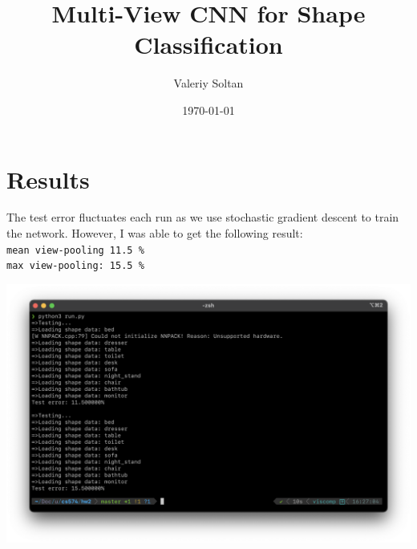 \documentclass{article}
\title{Multi-View CNN for Shape Classification}
\author{Valeriy Soltan}
\date{\today}
\begin{document}
\maketitle

\section*{Results}
The test error fluctuates each run as we use stochastic gradient descent to train the network. However, I was able to get the following result: \\

\noindent \texttt{mean view-pooling 11.5 \%} \\
\texttt{max view-pooling: 15.5 \%}

\begin{center}
	\includegraphics[scale=0.35]{assets/result}
\end{center}
\end{document}
